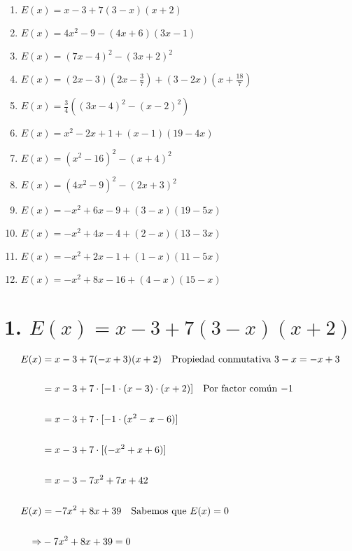 \documentclass[12pt]{article}
\begin{document}
\begin{enumerate}
    \item $E(x) = x - 3 + 7( 3 - x )( x + 2 )$\\
    \item $E(x) = 4x^{2} - 9 - (4x+6)(3x-1)$\\
    \item $E(x) = (7x-4)^{2}-(3x+2)^{2}$\\
    \item $E(x) = (2x-3)(2x-\frac{3}{7})+(3-2x)(x+\frac{18}{7})$\\
    \item $E(x) = \frac{3}{4}((3x-4)^{2} - (x-2)^{2})$\\
    \item $E(x) = x^{2} - 2x + 1 +(x-1)(19-4x)$\\
    \item $E(x) = (x^{2}-16)^{2} - (x+4)^2$\\
    \item $E(x) = (4x^{2} - 9)^{2} - (2x+3)^{2}$\\
    \item $E(x) = -x^{2} + 6x -9 + (3-x)(19-5x)$\\
    \item $E(x) = -x^{2} + 4x-4 + (2-x)(13-3x)$\\
    \item $E(x) = -x^{2} + 2x-1 + (1-x)(11-5x)$\\
    \item $E(x) = -x^{2} + 8x-16 + (4-x)(15-x)$\\
\end{enumerate}
    \newpage
\section*{1. $ E(x) = x - 3 + 7( 3 - x )( x + 2 )$ }  

{}

\begin{equation*}
    \begin{split}
      E(x) & = x-3+7(-x+3)(x+2) \quad \textup{Propiedad conmutativa $3-x = -x+3$} \\\\ 
      & = x-3+7\cdot[-1\cdot(x-3)\cdot(x+2)] \quad \textup{Por factor común $-1$}\\\\
      & = x-3+7\cdot[-1\cdot(x^{2}-x-6)]\\\\
      & = x-3+7\cdot[(-x^{2}+x+6)]\\\\
      & = x-3-7x^{2}+7x+42\\\\
      E(x) & =-7x^{2}+8x+39 \quad \textup{Sabemos que $E(x)= 0$} \\\\
      \Rightarrow & -7x^{2}+8x+39 = 0 \quad \\\\
    \end{split}
\end{equation*}
\end{document}
